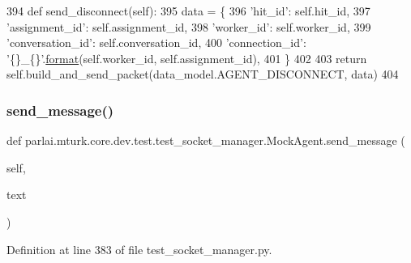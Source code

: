 \begin{DoxyCode}
394     \textcolor{keyword}{def }send\_disconnect(self):
395         data = \{
396             \textcolor{stringliteral}{'hit\_id'}: self.hit\_id,
397             \textcolor{stringliteral}{'assignment\_id'}: self.assignment\_id,
398             \textcolor{stringliteral}{'worker\_id'}: self.worker\_id,
399             \textcolor{stringliteral}{'conversation\_id'}: self.conversation\_id,
400             \textcolor{stringliteral}{'connection\_id'}: \textcolor{stringliteral}{'\{\}\_\{\}'}.\hyperlink{namespaceparlai_1_1chat__service_1_1services_1_1messenger_1_1shared__utils_a32e2e2022b824fbaf80c747160b52a76}{format}(self.worker\_id, self.assignment\_id),
401         \}
402 
403         \textcolor{keywordflow}{return} self.build\_and\_send\_packet(data\_model.AGENT\_DISCONNECT, data)
404 
\end{DoxyCode}
\mbox{\label{classparlai_1_1mturk_1_1core_1_1dev_1_1test_1_1test__socket__manager_1_1MockAgent_a0e22c9a64a4c8cefe48c673c16917ba8}} 
\subsubsection{\texorpdfstring{send\+\_\+message()}{send\_message()}}
{\footnotesize\ttfamily def parlai.\+mturk.\+core.\+dev.\+test.\+test\+\_\+socket\+\_\+manager.\+Mock\+Agent.\+send\+\_\+message (\begin{DoxyParamCaption}\item[{}]{self,  }\item[{}]{text }\end{DoxyParamCaption})}



Definition at line 383 of file test\+\_\+socket\+\_\+manager.\+py.


